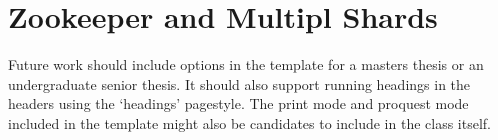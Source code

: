 \section{Zookeeper and Multipl Shards}

Future work should include options in the template for a masters thesis or an undergraduate senior thesis. It should also support running headings in the headers using the `headings' pagestyle.  The print mode and proquest mode included in the template might also be candidates to include in the class itself. 

 
